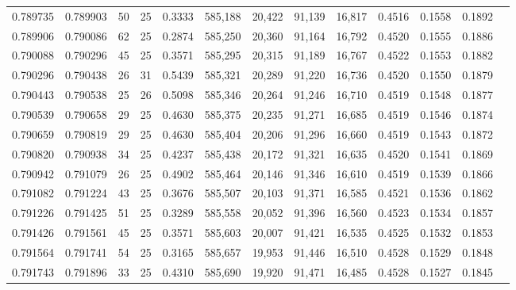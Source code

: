 \begin{tabular}{rrrrrrrrrrrrr}
0.789735 & 0.789903 &    50 &  25 &                                     0.3333 & 585,188 &  20,422 &  91,139 &  16,817 & 0.4516 & 0.1558 & 0.1892 \\
0.789906 & 0.790086 &    62 &  25 &                                     0.2874 & 585,250 &  20,360 &  91,164 &  16,792 & 0.4520 & 0.1555 & 0.1886 \\
0.790088 & 0.790296 &    45 &  25 &                                     0.3571 & 585,295 &  20,315 &  91,189 &  16,767 & 0.4522 & 0.1553 & 0.1882 \\
0.790296 & 0.790438 &    26 &  31 &                                     0.5439 & 585,321 &  20,289 &  91,220 &  16,736 & 0.4520 & 0.1550 & 0.1879 \\
0.790443 & 0.790538 &    25 &  26 &                                     0.5098 & 585,346 &  20,264 &  91,246 &  16,710 & 0.4519 & 0.1548 & 0.1877 \\
0.790539 & 0.790658 &    29 &  25 &                                     0.4630 & 585,375 &  20,235 &  91,271 &  16,685 & 0.4519 & 0.1546 & 0.1874 \\
0.790659 & 0.790819 &    29 &  25 &                                     0.4630 & 585,404 &  20,206 &  91,296 &  16,660 & 0.4519 & 0.1543 & 0.1872 \\
0.790820 & 0.790938 &    34 &  25 &                                     0.4237 & 585,438 &  20,172 &  91,321 &  16,635 & 0.4520 & 0.1541 & 0.1869 \\
0.790942 & 0.791079 &    26 &  25 &                                     0.4902 & 585,464 &  20,146 &  91,346 &  16,610 & 0.4519 & 0.1539 & 0.1866 \\
0.791082 & 0.791224 &    43 &  25 &                                     0.3676 & 585,507 &  20,103 &  91,371 &  16,585 & 0.4521 & 0.1536 & 0.1862 \\
0.791226 & 0.791425 &    51 &  25 &                                     0.3289 & 585,558 &  20,052 &  91,396 &  16,560 & 0.4523 & 0.1534 & 0.1857 \\
0.791426 & 0.791561 &    45 &  25 &                                     0.3571 & 585,603 &  20,007 &  91,421 &  16,535 & 0.4525 & 0.1532 & 0.1853 \\
0.791564 & 0.791741 &    54 &  25 &                                     0.3165 & 585,657 &  19,953 &  91,446 &  16,510 & 0.4528 & 0.1529 & 0.1848 \\
0.791743 & 0.791896 &    33 &  25 &                                     0.4310 & 585,690 &  19,920 &  91,471 &  16,485 & 0.4528 & 0.1527 & 0.1845 \\

\end{tabular}
